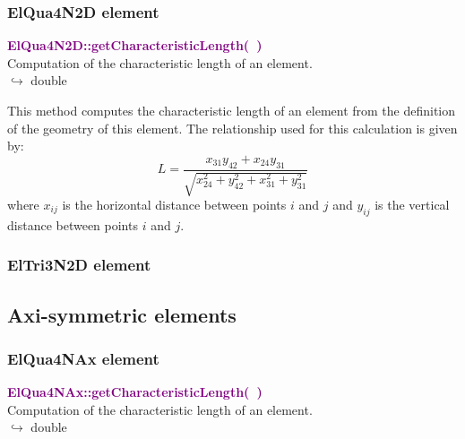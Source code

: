 \subsubsection{ElQua4N2D element}

\textcolor{purple}{\textbf{ElQua4N2D::getCharacteristicLength(~)}}\label{ElQua4N2D::getCharacteristicLength()}\\
Computation of the characteristic length of an element.\\ \hspace*{10mm}$\hookrightarrow$ double

This method computes the characteristic length of an element from the definition of the geometry of this element.
The relationship used for this calculation is given by:
\begin{equation}
L=\frac{x_{31} y_{42}+x_{24} y_{31}}{\sqrt{x_{24}^2+y_{42}^2+x_{31}^2+y_{31}^2}}
\end{equation}
where $x_{ij}$ is the horizontal distance between points $i$ and $j$ and $y_{ij}$ is the vertical distance between points $i$ and $j$.

\subsubsection{ElTri3N2D element}

\subsection{Axi-symmetric elements}

\subsubsection{ElQua4NAx element}

\textcolor{purple}{\textbf{ElQua4NAx::getCharacteristicLength(~)}}\label{ElQua4NAx::getCharacteristicLength()}\\
Computation of the characteristic length of an element.\\ \hspace*{10mm}$\hookrightarrow$ double

